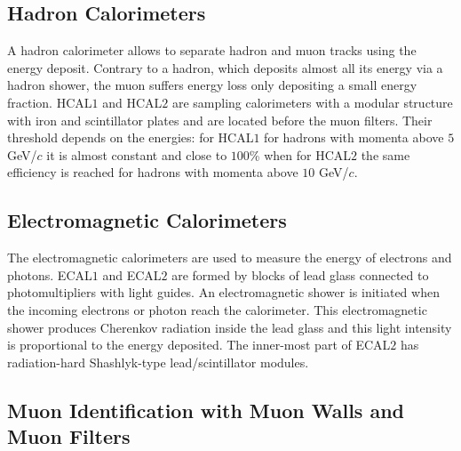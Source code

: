 \subsection{Hadron Calorimeters}

A hadron calorimeter allows to separate hadron and muon tracks using the energy deposit. Contrary to a hadron, which deposits almost all its energy via a hadron shower, the muon suffers energy loss only depositing a small energy fraction. HCAL$1$ and HCAL$2$ are sampling calorimeters with a modular structure with iron and scintillator plates and are located before the muon filters. Their threshold depends on the energies: for HCAL$1$ for hadrons with momenta above $5$ GeV/$c$ it is almost constant and close to $100$\% when for HCAL$2$ the same efficiency is reached for hadrons with momenta above $10$ GeV/$c$.

\subsection{Electromagnetic Calorimeters}

The electromagnetic calorimeters are used to measure the energy of electrons and photons. ECAL$1$ and ECAL$2$ are formed by blocks of lead glass connected to photomultipliers with light guides. An electromagnetic shower is initiated when the incoming electrons or photon reach the calorimeter. This electromagnetic shower produces Cherenkov radiation inside the lead glass and this light intensity is proportional to the energy deposited. The inner-most part of ECAL$2$ has radiation-hard Shashlyk-type lead/scintillator modules.

\subsection{Muon Identification with Muon Walls and Muon Filters}

